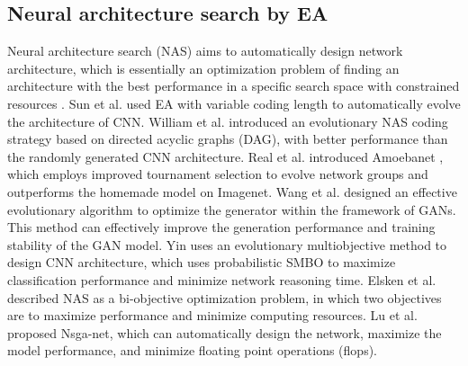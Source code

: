 \documentclass[lettersize,journal]{IEEEtran}
\begin{document}
\subsection{Neural architecture search by EA}
Neural architecture search (NAS) aims to automatically design network architecture, which is essentially an optimization problem of finding an architecture with the best performance in a specific search space with constrained resources \cite{50, 51}. Sun et al. \cite{52} used EA with variable coding length to automatically evolve the architecture of CNN. William et al. \cite{8790093} introduced an evolutionary NAS coding strategy based on directed acyclic graphs (DAG), with better performance than the randomly generated CNN architecture. Real et al. introduced Amoebanet \cite{54}, which employs improved tournament selection to evolve network groups and outperforms the homemade model on Imagenet. Wang et al. \cite{55} designed an effective evolutionary algorithm to optimize the generator within the framework of GANs. This method can effectively improve the generation performance and training stability of the GAN model. Yin \cite{56} uses an evolutionary multiobjective method to design CNN architecture, which uses probabilistic SMBO to maximize classification performance and minimize network reasoning time. Elsken et al. \cite{57} described NAS as a bi-objective optimization problem, in which two objectives are to maximize performance and minimize computing resources. Lu et al. \cite{58} proposed Nsga-net, which can automatically design the network, maximize the model performance, and minimize floating point operations (flops).
\end{document}
